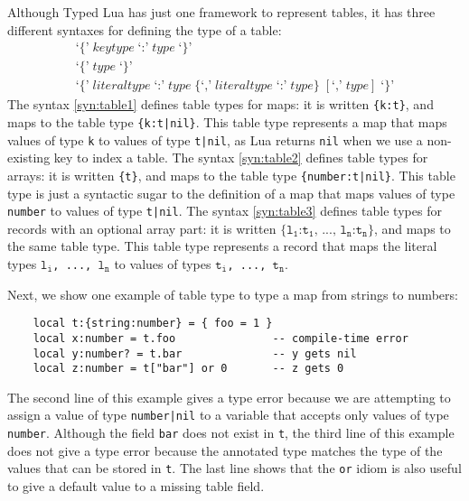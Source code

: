 Although Typed Lua has just one framework to represent tables,
it has three different syntaxes for defining the type of a table:
\begin{align}
\label{syn:table1}
\texttt{`\{'} \; \textit{keytype} \; \texttt{`:'} \; \textit{type} \; \texttt{`\}'}\\
\label{syn:table2}
\texttt{`\{'} \; \textit{type} \; \texttt{`\}'}\\
\label{syn:table3}
\texttt{`\{'} \; \textit{literaltype} \; \texttt{`:'} \; \textit{type} \;
\{\texttt{`,'} \; \textit{literaltype} \; \texttt{`:'} \; \textit{type}\} \;
[\texttt{`,'} \; \textit{type}] \; \texttt{`\}'}
\end{align}
The syntax \ref{syn:table1} defines table types for maps:
it is written \texttt{\{k:t\}},
and maps to the table type \texttt{\{k:t|nil\}}.
This table type represents a map that maps values of type
\texttt{k} to values of type \texttt{t|nil},
as Lua returns \texttt{nil} when we use a non-existing key to index a table.
The syntax \ref{syn:table2} defines table types for arrays:
it is written \texttt{\{t\}},
and maps to the table type \texttt{\{number:t|nil\}}.
This table type is just a syntactic sugar to the definition of a
map that maps values of type \texttt{number} to values of type \texttt{t|nil}.
The syntax \ref{syn:table3} defines table types for records with an
optional array part: it is written
$\texttt{\{l}{_\texttt{1}}\texttt{:t}_{\texttt{1}}
\texttt{, ..., l}{_\texttt{n}}\texttt{:t}_{\texttt{n}}\texttt{\}}$,
and maps to the same table type.
This table type represents a record that maps the literal types
$\texttt{l}_{\texttt{i}}$\texttt{, ..., }$\texttt{l}_{\texttt{n}}$
to values of types $\texttt{t}_{\texttt{i}}$\texttt{, ..., }$\texttt{t}_{\texttt{n}}$.

Next, we show one example of table type to type a map from strings to numbers:
\begin{verbatim}
    local t:{string:number} = { foo = 1 } 
    local x:number = t.foo               -- compile-time error
    local y:number? = t.bar              -- y gets nil
    local z:number = t["bar"] or 0       -- z gets 0 
\end{verbatim}

The second line of this example gives a type error because we are
attempting to assign a value of type \texttt{number|nil} to a
variable that accepts only values of type \texttt{number}.
Although the field \texttt{bar} does not exist in \texttt{t}, the third
line of this example does not give a type error because the
annotated type matches the type of the values that can be stored in
\texttt{t}.
The last line shows that the \texttt{or} idiom is also useful to
give a default value to a missing table field.

